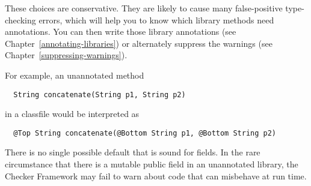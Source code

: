 These choices are conservative.  They are likely to cause many
false-positive type-checking errors, which will help you to know which
library methods need annotations.  You can then write those library
annotations (see Chapter~\ref{annotating-libraries}) or alternately
suppress the warnings (see Chapter~\ref{suppressing-warnings}).

For example, an unannotated method

\begin{Verbatim}
  String concatenate(String p1, String p2)
\end{Verbatim}

\noindent
in a classfile would be interpreted as

\begin{Verbatim}
  @Top String concatenate(@Bottom String p1, @Bottom String p2)
\end{Verbatim}

There is no single possible default that is sound for fields.  In the rare
circumstance that there is a mutable public field in an unannotated
library, the Checker Framework may fail to warn about code that can
misbehave at run time.






